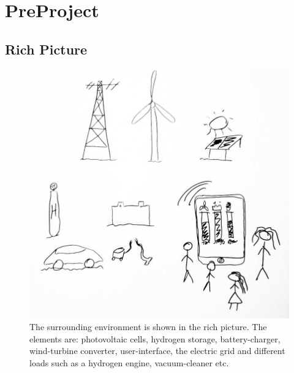 \section{PreProject}
\subsection{Rich Picture}

\begin{figure}[h!]		%
 \begin{centering}
  \includegraphics[width=1\textwidth]{images/rich_picture1.png}
   \caption{The surrounding environment is shown in the rich picture. The
 			 elements are: photovoltaic cells, hydrogen storage, battery-charger, wind-turbine
 			 converter, user-interface, the electric grid and different loads such as a
 			 hydrogen engine, vacuum-cleaner etc. }
 \end{centering}
\end{figure}

